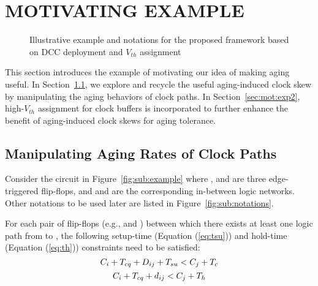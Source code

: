 \section{MOTIVATING EXAMPLE}
\label{sec:motivate}
\begin{figure*}[!ht]
    \centering
    \hspace{0.0cm}
    \caption{Illustrative example and notations for the proposed framework based on DCC deployment and $V_{th}$ assignment}
    \label{fig:en}
\end{figure*}


This section introduces the example of motivating our idea of making aging useful. In Section~\ref{sec:mot:exp1}, we explore and recycle the useful aging-induced clock skew by manipulating the aging behaviors of clock paths. In Section~\ref{sec:mot:exp2}, high-$V_{th}$ assignment for clock buffers is incorporated to further enhance the benefit of aging-induced clock skews for aging tolerance. 

\subsection{Manipulating Aging Rates of Clock Paths}
\label{sec:mot:exp1}
Consider the circuit in Figure~\ref{fig:sub:example} where ,  and  are three edge-triggered flip-flops, and  and  are the corresponding in-between logic networks. Other notations to be used later are listed in Figure~\ref{fig:sub:notations}.

For each pair of flip-flops (e.g.,  and ) between which there exists at least one logic path from  to , the following setup-time (Equation (\ref{eq:tsu})) and hold-time (Equation (\ref{eq:th})) constraints need to be satisfied:
\begin{equation}
	\fontsize{9}{9.6} C_i+T_{cq}+D_{ij}+T_{su}<C_j+T_c
	\label{eq:tsu}
\end{equation}
\begin{equation}
	\fontsize{9}{9.6} C_i+T_{cq}+d_{ij}<C_j+T_h
	\label{eq:th}
\end{equation}

